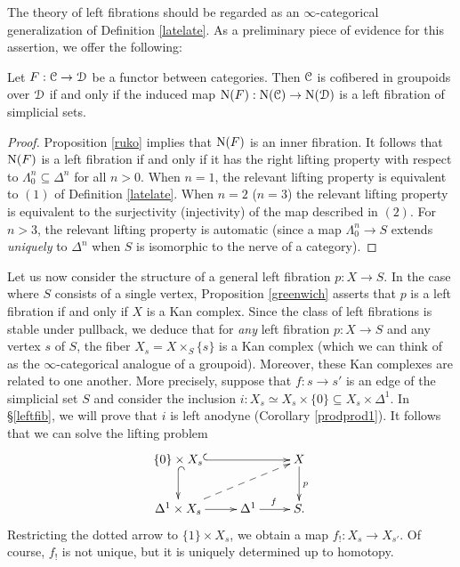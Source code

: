 The theory of left fibrations should be regarded as an $\infty$-categorical generalization of Definition \ref{latelate}. As a preliminary piece of evidence for this assertion, we offer the following:

\begin{proposition}\label{stinkyer}
Let $F: \operatorname{\mathcal{C}} \rightarrow \operatorname{\mathcal{D}}$ be a functor between categories. Then $\operatorname{\mathcal{C}}$ is cofibered in groupoids over $\operatorname{\mathcal{D}}$ if and only if the induced map $\operatorname{N}(F): \operatorname{N}(\operatorname{\mathcal{C}}) \rightarrow \operatorname{N}(\operatorname{\mathcal{D}})$ is a left fibration of simplicial sets.
\end{proposition}

\begin{proof}
Proposition \ref{ruko} implies that $\operatorname{N}(F)$ is an inner fibration. It follows that
$\operatorname{N}(F)$ is a left fibration if and only if it has the right lifting property with respect to
$\Lambda^n_0 \subseteq \Delta^n$ for all $n > 0$. When $n = 1$, the relevant lifting property is equivalent to $(1)$ of Definition \ref{latelate}. When $n=2$ ($n=3$) the relevant lifting property is
equivalent to the surjectivity (injectivity) of the map described in $(2)$. For $n > 3$, the relevant lifting property is automatic (since a map $\Lambda^n_0 \rightarrow S$ extends {\em uniquely} to $\Delta^n$ when $S$ is isomorphic to the nerve of a category). 
\end{proof}

Let us now consider the structure of a general left fibration $p: X \rightarrow S$.
In the case where $S$ consists of a single vertex, Proposition \ref{greenwich} asserts that $p$ is a left fibration if and only if $X$ is a Kan complex. Since the class of left fibrations is stable under pullback, we deduce that for {\em any} left fibration $p: X \rightarrow S$ and any vertex $s$ of $S$, the fiber $X_{s} = X \times_S \{s\}$ is a Kan complex (which we can think of as the $\infty$-categorical analogue of a groupoid). Moreover, these Kan complexes are related to one another. More precisely, suppose that $f: s \rightarrow s'$ is an edge of the simplicial set $S$ and consider the inclusion
$i: X_s \simeq X_s \times \{0\} \subseteq X_s
\times \Delta^{1}$. In \S \ref{leftfib}, we will prove that $i$ is left anodyne (Corollary \ref{prodprod1}). 
It follows that we can solve the lifting problem
$$ \xymatrix{ \{0 \} \times X_{s} \ar@{^{(}->}[d] \ar@{^{(}->}[rr] & & X \ar[d]^{p} \\
\Delta^1 \times X_{s} \ar@{-->}[urr] \ar[r] & \Delta^1 \ar[r]^{f} & S.}$$
Restricting the dotted arrow to $\{1\} \times X_{s}$, we obtain a map
$f_{!}: X_{s} \rightarrow X_{s'}$. Of course, $f_{!}$ is not unique, but it is uniquely determined
up to homotopy.


